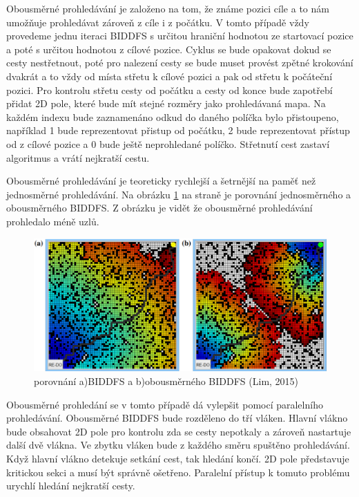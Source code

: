 \documentclass[12pt]{report}
\begin{document}
	Obousměrné prohledávání je založeno na tom, že známe pozici cíle a to nám umožňuje prohledávat zároveň z cíle i z počátku. V tomto případě vždy provedeme jednu iteraci BIDDFS s určitou hraniční hodnotou ze startovací pozice a poté s určitou hodnotou z cílové pozice. Cyklus se bude opakovat dokud se cesty nestřetnout, poté pro nalezení cesty se bude muset provést zpětné krokování dvakrát a to vždy od místa střetu k cílové pozici a pak od střetu k počáteční pozici. Pro kontrolu střetu cesty od počátku a cesty od konce bude zapotřebí přidat 2D pole, které bude mít stejné rozměry jako prohledávaná mapa. Na každém indexu bude zaznamenáno odkud do daného políčka bylo přistoupeno, například 1 bude reprezentovat přistup od počátku, 2 bude reprezentovat přístup od z cílové pozice a 0 bude ještě neprohledané políčko. Střetnutí cest zastaví algoritmus a vrátí nejkratší cestu.
	
	Obousměrné prohledávání je teoreticky rychlejší a šetrnější na paměť než jednosměrné prohledávání. Na obrázku \ref{fig:bbiddfs} na straně \pageref{fig:bbiddfs} je porovnání jednosměrného a obousměrného BIDDFS. Z obrázku je vidět že obousměrné prohledávání prohledalo méně uzlů.
	
	
	\begin{figure}[h]
		\centering
		\includegraphics[width=1\textwidth]{img/bbiddfs}
		\caption{porovnání a)BIDDFS a b)obousměrného BIDDFS (Lim, 2015)}
		\label{fig:bbiddfs}
	\end{figure}
	
	Obousměrné prohledání se v tomto případě dá vylepšit pomocí paralelního prohledávání. Obousměrné BIDDFS bude rozděleno do tří vláken. Hlavní vlákno bude obsahovat 2D pole pro kontrolu zda se cesty nepotkaly a zároveň nastartuje další dvě vlákna. Ve zbytku vláken bude z každého směru spuštěno prohledávání. Když hlavní vlákno detekuje setkání cest, tak hledání končí. 2D pole představuje kritickou sekci a musí být správně ošetřeno.
	Paralelní přístup k tomuto problému urychlí hledání nejkratší cesty.
	
\end{document}
